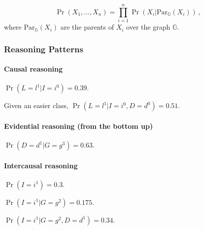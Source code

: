 \documentclass[12pt]{article}
\begin{document}
\begin{equation}
  \Pr(X_1, ..., X_n) = \prod_{i=1}^n \Pr(X_i | \text{Par}_\mathbb{G}( X_i ) ) \, ,
\end{equation}
where $\text{Par}_\mathbb{G}( X_i )$ are the parents of $X_i$ over the graph $\mathbb{G}$.


\subsubsection{Reasoning Patterns}
\paragraph{Causal reasoning}
$\Pr(L = l^1 | I = i^0) = 0.39$.

Given an easier class, $\Pr(L = l^1 | I = i^0, D = d^0) = 0.51$.

\paragraph{Evidential reasoning (from the bottom up)}
$\Pr(D = d^1 | G = g^3) = 0.63$.

\paragraph{Intercausal reasoning}
$\Pr(I = i^1) = 0.3$.

$\Pr(I = i^1 | G = g^2) = 0.175$.

$\Pr(I = i^1 | G = g^2, D = d^1) = 0.34$.












\end{document}
